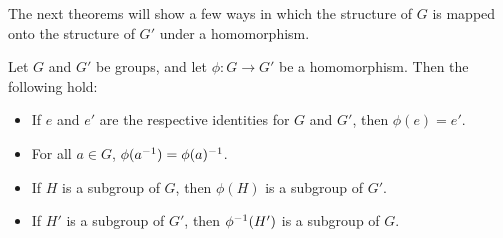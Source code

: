 The next theorems will show a few ways in which the structure of $G$ is mapped onto the structure of $G'$ under a homomorphism.

\begin{theorem}
Let $G$ and $G'$ be groups, and let $\phi: G \to G'$ be a homomorphism. Then the following hold:
\begin{itemize}
    \item If $e$ and $e'$ are the respective identities for $G$ and $G'$, then $\phi(e) = e'$.
    \item For all $a \in G$, $\phi(a^{-1}) = \phi(a)^{-1}$.
    \item If $H$ is a subgroup of $G$, then $\phi(H)$ is a subgroup of $G'$.
    \item If $H'$ is a subgroup of $G'$, then $\phi^{-1}(H')$ is a subgroup of $G$.
\end{itemize}
\end{theorem}

